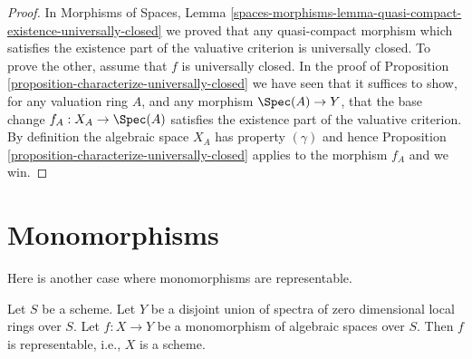 \begin{proof}
In
Morphisms of Spaces,
Lemma \ref{spaces-morphisms-lemma-quasi-compact-existence-universally-closed}
we proved that any quasi-compact morphism which satisfies the existence
part of the valuative criterion is universally closed.
To prove the other, assume that $f$ is universally closed.
In the proof of
Proposition \ref{proposition-characterize-universally-closed}
we have seen that it suffices to show, for any valuation ring $A$,
and any morphism $\Spec(A) \to Y$, that the base change
$f_A : X_A \to \Spec(A)$ satisfies the existence part of the valuative
criterion. By definition the algebraic space $X_A$ has property $(\gamma)$
and hence
Proposition \ref{proposition-characterize-universally-closed}
applies to the morphism $f_A$ and we win.
\end{proof}








\section{Monomorphisms}
\label{section-monomorphisms}

\noindent
Here is another case where monomorphisms are representable.

\begin{lemma}
\label{lemma-monomorphism-toward-disjoint-union-dim-0-rings}
Let $S$ be a scheme. Let $Y$ be a disjoint union of spectra of
zero dimensional local rings over $S$.
Let $f : X \to Y$ be a monomorphism of algebraic spaces over $S$.
Then $f$ is representable, i.e., $X$ is a scheme.
\end{lemma}

